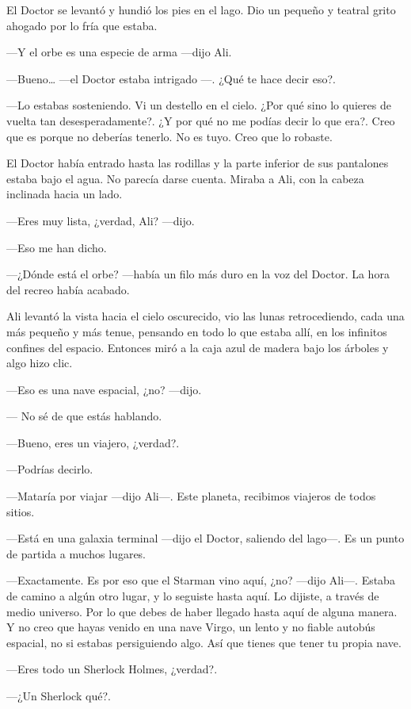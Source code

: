 El Doctor se levantó y hundió los pies en el lago. Dio un pequeño y
teatral grito ahogado por lo fría que estaba.

---Y el orbe es una especie de arma ---dijo Ali.

---Bueno\ldots{} ---el Doctor estaba intrigado ---. ¿Qué te hace decir
eso?.

---Lo estabas sosteniendo. Vi un destello en el cielo. ¿Por qué sino lo
quieres de vuelta tan desesperadamente?. ¿Y por qué no me podías decir
lo que era?. Creo que es porque no deberías tenerlo. No es tuyo. Creo
que lo robaste.

El Doctor había entrado hasta las rodillas y la parte inferior de sus
pantalones estaba bajo el agua. No parecía darse cuenta. Miraba a Ali,
con la cabeza inclinada hacia un lado.

---Eres muy lista, ¿verdad, Ali? ---dijo.

---Eso me han dicho.

---¿Dónde está el orbe? ---había un filo más duro en la voz del Doctor.
La hora del recreo había acabado.

Ali levantó la vista hacia el cielo oscurecido, vio las lunas
retrocediendo, cada una más pequeño y más tenue, pensando en todo lo que
estaba allí, en los infinitos confines del espacio. Entonces miró a la
caja azul de madera bajo los árboles y algo hizo clic.

---Eso es una nave espacial, ¿no? ---dijo.

--- No sé de que estás hablando.

---Bueno, eres un viajero, ¿verdad?.

---Podrías decirlo.

---Mataría por viajar ---dijo Ali---. Este planeta, recibimos viajeros
de todos sitios.

---Está en una galaxia terminal ---dijo el Doctor, saliendo del lago---.
Es un punto de partida a muchos lugares.

---Exactamente. Es por eso que el Starman vino aquí, ¿no? ---dijo
Ali---. Estaba de camino a algún otro lugar, y lo seguiste hasta aquí.
Lo dijiste, a través de medio universo. Por lo que debes de haber
llegado hasta aquí de alguna manera. Y no creo que hayas venido en una
nave Virgo, un lento y no fiable autobús espacial, no si estabas
persiguiendo algo. Así que tienes que tener tu propia nave.

---Eres todo un Sherlock Holmes, ¿verdad?.

---¿Un Sherlock qué?.

